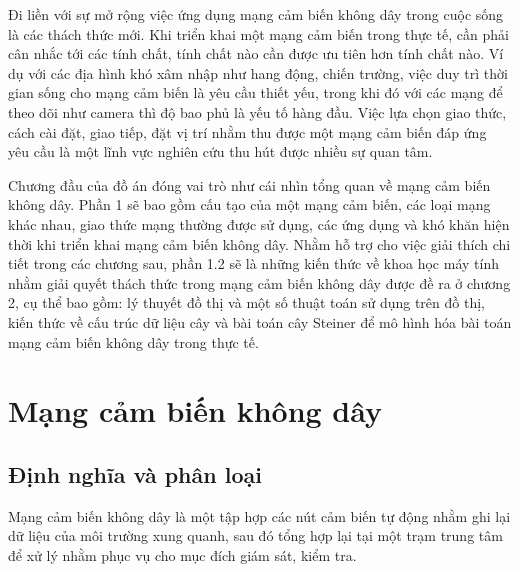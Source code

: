 Đi liền với sự mở rộng việc ứng dụng mạng cảm biến không dây trong cuộc sống là các thách thức mới. Khi triển khai một mạng cảm biến trong thực tế, cần phải cân nhắc tới các tính chất, tính chất nào cần được ưu tiên hơn tính chất nào. Ví dụ với các địa hình khó xâm nhập như hang động, chiến trường, việc duy trì thời gian sống cho mạng cảm biến là yêu cầu thiết yếu, trong khi đó với các mạng để theo dõi như camera thì độ bao phủ là yếu tố hàng đầu. Việc lựa chọn giao thức, cách cài đặt, giao tiếp, đặt vị trí nhằm thu được một mạng cảm biến đáp ứng yêu cầu là một lĩnh vực nghiên cứu thu hút được nhiều sự quan tâm.

 
Chương đầu của đồ án đóng vai trò như cái nhìn tổng quan về mạng cảm biến không dây. Phần 1 sẽ bao gồm cấu tạo của một mạng cảm biến, các loại mạng khác nhau, giao thức mạng thường được sử dụng, các ứng dụng và khó khăn hiện thời khi triển khai mạng cảm biến không dây. Nhằm hỗ trợ cho việc giải thích chi tiết trong các chương sau, phần 1.2 sẽ là những kiến thức về khoa học máy tính nhằm giải quyết thách thức trong mạng cảm biến không dây được đề ra ở chương 2, cụ thể bao gồm: lý thuyết đồ thị và một số thuật toán sử dụng trên đồ thị, kiến thức về cấu trúc dữ liệu cây và bài toán cây Steiner để mô hình hóa bài toán mạng cảm biến không dây trong thực tế.

\section{Mạng cảm biến không dây}
\subsection{Định nghĩa và phân loại}
Mạng cảm biến không dây là một tập hợp các nút cảm biến tự động nhằm ghi lại dữ liệu của môi trường xung quanh, sau đó tổng hợp lại tại một trạm trung tâm để xử lý nhằm phục vụ cho mục đích giám sát, kiểm tra.\cite{koviwireless}


